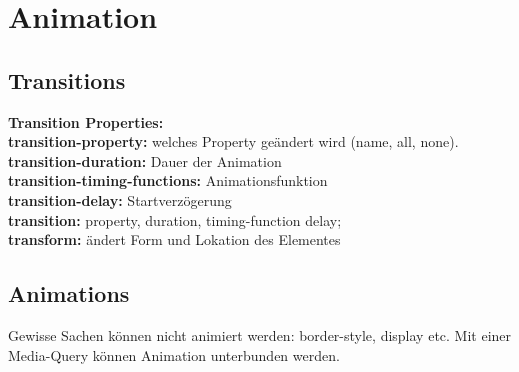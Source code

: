 
\section{Animation}

\subsection{Transitions}
\textbf{\color{blue}Transition Properties:} \\
\textbf{transition-property:} welches Property geändert wird (name, all, none). \\
\textbf{transition-duration:} Dauer der Animation \\
\textbf{transition-timing-functions:} Animationsfunktion \\
\textbf{transition-delay:} Startverzögerung \\
\textbf{transition:} property, duration, timing-function delay;\\
\textbf{transform:} ändert Form und Lokation des Elementes

\subsection{Animations}
Gewisse Sachen können nicht animiert werden: border-style, display etc. Mit einer Media-Query können Animation unterbunden werden.


